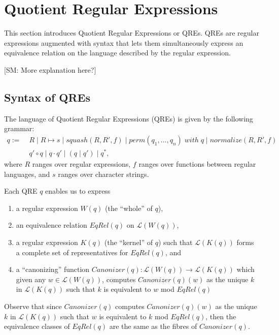 \documentclass{svproc}
\newcommand{\FINISH}[3]{\ifdraft\textcolor{#1}{[#2: #3]}\fi}
\newcommand{\sam}[1]{\FINISH{dkpurple}{SM}{#1}}
\newcommand{\squash}[3]{\ensuremath{\mathit{squash}(#1, #2, #3)}}
\newcommand{\perm}[2]{\ensuremath{\mathit{perm}(#1)\; \mathit{with}\; #2}}
\newcommand{\normalize}[3]{\ensuremath{\mathit{normalize}(#1, #2, #3)}}
\newcommand{\sep}{\ensuremath{\; | \;}}
\begin{document}
\section{Quotient Regular Expressions}
This section introduces Quotient Regular Expressions or QREs. QREs are regular
expressions augmented with syntax that lets them simultaneously express an
equivalence relation on the language described by the regular expression.

\sam{More explanation here?}

  \subsection{Syntax of QREs}
The language of Quotient Regular Expressions (QREs) is given by the following
grammar:
\begin{align*}
q := \; &R \sep R \mapsto s \sep \squash{R}{R'}{f} \sep
\perm{q_1, \ldots, q_n}{q} \;  | \; \normalize{R}{R'}{f}\\
&q' \circ q \sep q \cdot q' \sep (q \sep q') \sep q^*,
\end{align*}
where $R$ ranges over regular expressions, $f$ ranges over functions between
regular languages, and $s$ ranges over character strings.

Each QRE $q$ enables us to express
\begin{enumerate}
  \item a regular expression $W(q)$ (the ``whole'' of $q$),
  \item an equivalence relation $EqRel(q)$ on $\mathcal{L}(W(q))$,
  \item a regular expression $K(q)$ (the ``kernel'' of $q$)
  such that $\mathcal{L}(K(q))$ forms a complete set of representatives for
  $EqRel(q)$, and
  \item a ``canonizing'' function $Canonizer(q):\mathcal{L}(W(q))
  \longrightarrow \mathcal{L}(K(q))$ which given any $w \in \mathcal{L}(W(q))$,
  computes $Canonizer(q)(w)$ as the unique $k$ in $\mathcal{L}(K(q))$ such that
  $k$ is equivalent to $w$ mod $EqRel(q)$
  \end{enumerate}
  Observe that since $Canonizer(q)$ computes $Canonizer(q)(w)$ as the unique $k$
  in $\mathcal{L}(K(q))$ such that $w$ is equivalent to $k$ mod $EqRel(q)$,
  then the equivalence classes of $EqRel(q)$ are the same as the fibres of
  $Canonizer(q)$.
\end{document}
